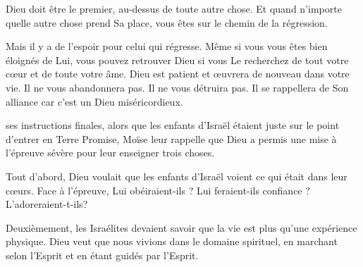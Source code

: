 Dieu doit être le premier, au-dessus de toute autre chose.
 Et quand n'importe quelle autre chose prend Sa place,
 vous êtes sur le chemin de la régression.

Mais il y a de l'espoir pour celui qui régresse.
 Même si vous vous êtes bien éloignés de Lui, vous pouvez retrouver Dieu
 si vous Le recherchez de tout votre cœur et de toute votre âme.
 Dieu est patient et œuvrera de nouveau dans votre vie.
 Il ne vous abandonnera pas. Il ne vous détruira pas.
 Il se rappellera de Son alliance car c'est un Dieu miséricordieux. 

\dvrule








 ses instructions finales,
 alors que les enfants d'Israël étaient juste sur le point
 d'entrer en Terre Promise, Moïse leur rappelle que Dieu
 a permis une mise à l'épreuve sévère pour leur enseigner trois choses.

Tout d'abord, Dieu voulait que les enfants d'Israël voient
 ce qui était dans leur cœurs.
 Face à l'épreuve, Lui obéiraient-ils ?
 Lui feraient-ils confiance ? L'adoreraient-t-ils?


Deuxièmement, les Israélites devaient savoir que la vie
 est plus qu'une expérience physique.
 Dieu veut que nous vivions dans le domaine spirituel,
 en marchant selon l'Esprit et en étant guidés par l'Esprit.

